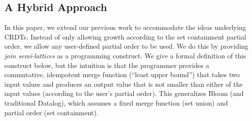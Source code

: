 \subsection{A Hybrid Approach}
In this paper, we extend our previous work to accommodate the ideas underlying CRDTs. Instead of only allowing growth according to the set containment
partial order, we allow any user-defined partial order to be used.  
We do this by providing \emph{join semi-lattices} as a programming construct.
We give a
formal definition of this construct below, but the intuition is that the programmer provides a commutative, idempotent merge function (``least upper bound'')
that takes two input values and produces an output value that is not smaller
than either of the input values (according to the user's partial order). This
generalizes Bloom (and traditional Datalog), which assumes a fixed merge
function (set union) and partial order (set containment).

